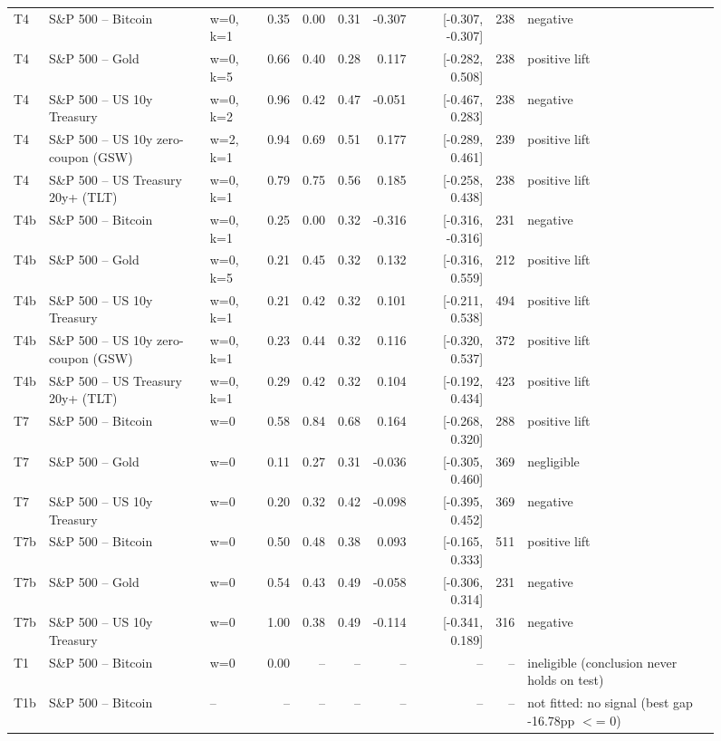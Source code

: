 \begin{figure}
\begin{tabular}{lllrrrrrrl}
T4 & S\&P 500 -- Bitcoin & w=0, k=1 & 0.35 & 0.00 & 0.31 & -0.307 & [-0.307, -0.307] & 238 & negative \\
T4 & S\&P 500 -- Gold & w=0, k=5 & 0.66 & 0.40 & 0.28 & 0.117 & [-0.282, 0.508] & 238 & positive lift \\
T4 & S\&P 500 -- US 10y Treasury & w=0, k=2 & 0.96 & 0.42 & 0.47 & -0.051 & [-0.467, 0.283] & 238 & negative \\
T4 & S\&P 500 -- US 10y zero-coupon (GSW) & w=2, k=1 & 0.94 & 0.69 & 0.51 & 0.177 & [-0.289, 0.461] & 239 & positive lift \\
T4 & S\&P 500 -- US Treasury 20y+ (TLT) & w=0, k=1 & 0.79 & 0.75 & 0.56 & 0.185 & [-0.258, 0.438] & 238 & positive lift \\
T4b & S\&P 500 -- Bitcoin & w=0, k=1 & 0.25 & 0.00 & 0.32 & -0.316 & [-0.316, -0.316] & 231 & negative \\
T4b & S\&P 500 -- Gold & w=0, k=5 & 0.21 & 0.45 & 0.32 & 0.132 & [-0.316, 0.559] & 212 & positive lift \\
T4b & S\&P 500 -- US 10y Treasury & w=0, k=1 & 0.21 & 0.42 & 0.32 & 0.101 & [-0.211, 0.538] & 494 & positive lift \\
T4b & S\&P 500 -- US 10y zero-coupon (GSW) & w=0, k=1 & 0.23 & 0.44 & 0.32 & 0.116 & [-0.320, 0.537] & 372 & positive lift \\
T4b & S\&P 500 -- US Treasury 20y+ (TLT) & w=0, k=1 & 0.29 & 0.42 & 0.32 & 0.104 & [-0.192, 0.434] & 423 & positive lift \\
T7 & S\&P 500 -- Bitcoin & w=0 & 0.58 & 0.84 & 0.68 & 0.164 & [-0.268, 0.320] & 288 & positive lift \\
T7 & S\&P 500 -- Gold & w=0 & 0.11 & 0.27 & 0.31 & -0.036 & [-0.305, 0.460] & 369 & negligible \\
T7 & S\&P 500 -- US 10y Treasury & w=0 & 0.20 & 0.32 & 0.42 & -0.098 & [-0.395, 0.452] & 369 & negative \\
T7b & S\&P 500 -- Bitcoin & w=0 & 0.50 & 0.48 & 0.38 & 0.093 & [-0.165, 0.333] & 511 & positive lift \\
T7b & S\&P 500 -- Gold & w=0 & 0.54 & 0.43 & 0.49 & -0.058 & [-0.306, 0.314] & 231 & negative \\
T7b & S\&P 500 -- US 10y Treasury & w=0 & 1.00 & 0.38 & 0.49 & -0.114 & [-0.341, 0.189] & 316 & negative \\
T1 & S\&P 500 -- Bitcoin & w=0 & 0.00 & -- & -- & -- & -- & -- & ineligible (conclusion never holds on test) \\
T1b & S\&P 500 -- Bitcoin & -- & -- & -- & -- & -- & -- & -- & not fitted: no signal (best gap -16.78pp $<$= 0) \\

\end{tabular}
\end{figure}
